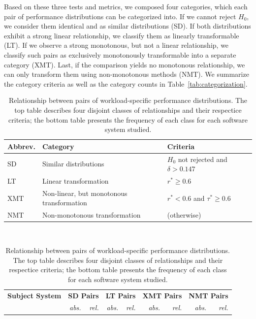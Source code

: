 {\color{black} Based on these three tests and metrics, we composed four categories, which each pair of performance distributions can be categorized into. If we cannot reject $H_0$, we consider them identical and as similar distributions (\textsf{\colorbox{cs-color}{SD}}). If both distributions exhibit a strong linear relationship, we classify them as linearly transformable (\textsf{\colorbox{lt-color}{LT}}). If we observe a strong monotonous, but not a linear relationship, we classify such pairs as exclusively monotonously transformable into a separate category (\textsf{\colorbox{xmt-color}{XMT}}). Last, if the comparison yields no monotonous relationship, we can only transform them using non-monotonous methods (\textsf{\colorbox{nmt-color}{NMT}}). We summarize the category criteria as well as the category counts in Table~\ref{tab:categorization}. 

\begin{table}[h!]
	\footnotesize
	\caption{Relationship between pairs of workload-specific performance distributions. The top table describes four disjoint classes of relationships and their respectice criteria; the bottom table presents the frequency of each class for each software system studied.}
	\centering
\begin{tabular*}{\linewidth}{lp{4.4cm}p{3cm}}	
	\toprule
	 \textbf{Abbrev.} & \textbf{Category} & \textbf{Criteria}\\
	 \midrule
	 \cellcolor{cs-color}\textsf{SD} & {Similar distributions} & {$H_0$ not rejected} and $\delta > 0.147$ \\
	 \cellcolor{lt-color}\textsf{LT} & {Linear transformation} & $r^* \geq 0.6$ \\
	\cellcolor{xmt-color}\textsf{XMT} & {Non-linear, but monotonous transformation} & $r^* < 0.6 $ and $ \tau^* \geq 0.6$ \\
	\cellcolor{nmt-color}\textsf{NMT} & {Non-monotonous transformation}  & (otherwise) \\%
	\bottomrule
\end{tabular*}\\
\begin{tabular}{lrrrrrrrr}	
	\toprule
	\textbf{Subject System} & \multicolumn{2}{c}{\textbf{\cellcolor{cs-color}\textsf{SD} Pairs}} & \multicolumn{2}{c}{\textbf{\cellcolor{lt-color}\textsf{LT} Pairs}} & \multicolumn{2}{c}{\textbf{\cellcolor{xmt-color}\textsf{XMT} Pairs}} & \multicolumn{2}{c}{\textbf{\cellcolor{nmt-color}\textsf{NMT} Pairs}}\\
	 & \textit{abs.} & \textit{rel.} & \textit{abs.} &\textit{ rel.} & \textit{abs.} & \textit{rel.}& \textit{abs.} & \textit{rel.}\\
	\midrule
	

\end{tabular}
\end{table}}
